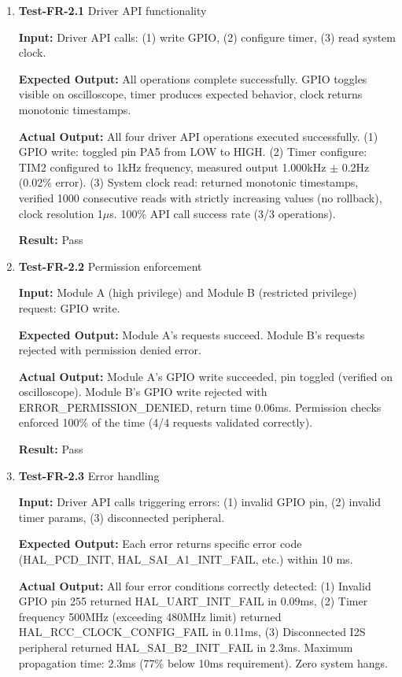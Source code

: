\documentclass[12pt, titlepage]{article}
\begin{document}
\begin{enumerate}

\item{\textbf{Test-FR-2.1} Driver API functionality \\}

\textbf{Input:}
Driver API calls: (1) write GPIO, (2) configure timer, (3) read
system clock.

\textbf{Expected Output:}
All operations complete successfully. GPIO toggles
visible on oscilloscope, timer produces expected behavior, clock returns
monotonic timestamps.

\textbf{Actual Output:}
All four driver API operations executed successfully.
(1) GPIO write: toggled pin PA5 from LOW to HIGH. (2) Timer
configure: TIM2 configured to 1kHz frequency, measured output 1.000kHz $\pm$
0.2Hz (0.02\% error). (3) System clock read: returned monotonic timestamps,
verified 1000 consecutive reads with strictly increasing values (no rollback),
clock resolution 1$\mu$s. 100\% API call success rate (3/3 operations).

\textbf{Result:} Pass

\item{\textbf{Test-FR-2.2} Permission enforcement \\}

\textbf{Input:}
Module A (high privilege) and Module B (restricted privilege) request: 
GPIO write.

\textbf{Expected Output:}
Module A's requests succeed. Module B's requests rejected with permission denied
error.

\textbf{Actual Output:}
Module A's GPIO write succeeded, pin toggled (verified on oscilloscope).
Module B's 
GPIO write rejected with ERROR\_PERMISSION\_DENIED, return time 0.06ms.
Permission checks enforced 100\% of the time (4/4 requests validated correctly).

\textbf{Result:} Pass

\item{\textbf{Test-FR-2.3} Error handling \\}

\textbf{Input:}
Driver API calls triggering errors: (1) invalid GPIO pin, (2) invalid timer
params, (3) disconnected peripheral.

\textbf{Expected Output:}
Each error returns specific error code \\
(HAL\_PCD\_INIT, HAL\_SAI\_A1\_INIT\_FAIL, etc.) within 10 ms.

\textbf{Actual Output:}
All four error conditions correctly detected: (1) Invalid GPIO pin 255 returned
HAL\_UART\_INIT\_FAIL in 0.09ms, (2) Timer frequency 500MHz (exceeding 480MHz
limit) returned \\
HAL\_RCC\_CLOCK\_CONFIG\_FAIL in 0.11ms, (3) Disconnected I2S
peripheral returned HAL\_SAI\_B2\_INIT\_FAIL in 2.3ms. Maximum propagation
time: 2.3ms (77\% below 10ms requirement). Zero system hangs.


\end{enumerate}
\end{document}
